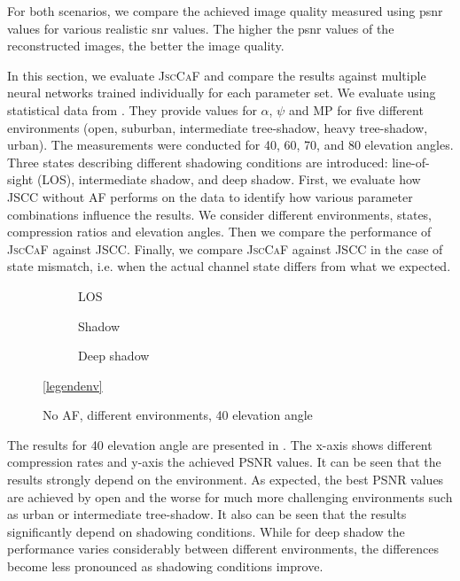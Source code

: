 \documentclass[conference]{IEEEtran}
\newcommand\MP{\ensuremath{\mathrm{MP}}\xspace}
\newcommand\ours{\textsc{JscCaF}\xspace}
\begin{document}
For both scenarios, we compare the achieved image quality measured using \ac{psnr} values for various realistic \ac{snr} values.
The higher the \ac{psnr} values of the reconstructed images, the better the image quality.



In this section, we evaluate \ours and compare the results against multiple neural networks trained individually for each parameter set.
We evaluate using statistical data from \cite{channel_values}. 
They provide values for $\alpha$, $\psi$ and \MP for five different environments (open, suburban, intermediate tree-shadow, heavy tree-shadow, urban).
The measurements were conducted for 40, 60, 70, and 80 elevation angles.
Three states describing different shadowing conditions are introduced: line-of-sight (LOS), intermediate shadow, and deep shadow.
First, we evaluate how JSCC without AF performs on the data to identify how various parameter combinations influence the results.
We consider different environments, states, compression ratios and elevation angles. 
Then we compare the performance of \ours against JSCC.
Finally, we compare \ours against JSCC in the case of state mismatch, i.e. when the actual channel state differs from what we expected.

\begin{figure}[t!]
  \begin{subfigure}{.32\linewidth}
  \centering
  
  \caption{LOS}
\end{subfigure}
\hfill
\begin{subfigure}{.32\linewidth}
  \centering
  
  \caption{Shadow}
\end{subfigure}
\hfill
\begin{subfigure}{.32\linewidth}
  \centering
  
  \caption{Deep shadow}
\end{subfigure}

\vspace{1em}
\centering
\ref{legendenv}

\caption{No AF, different environments, 40 elevation angle}
\label{fig:different_scenes_40}
\end{figure}

The results for 40 elevation angle are presented in . 
The x-axis shows different compression rates and y-axis the achieved PSNR values.
It can be seen that the results strongly depend on the environment.
As expected, the best PSNR values are achieved by open and the worse for much more challenging environments such as urban or intermediate tree-shadow.
It also can be seen that the results significantly depend on shadowing conditions. 
While for deep shadow the performance varies considerably between different environments, 
the differences become less pronounced as shadowing conditions improve.
\end{document}
